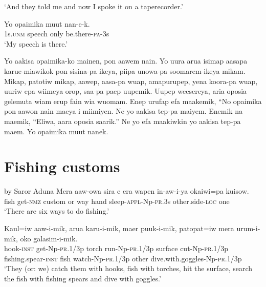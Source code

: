 \glt ‘And they told me and now I spoke it on a taperecorder.’ \\
\z


\ea
\gll  Yo  opaimika  muut  nan-e-k. \\
1s.\textsc{unm}  speech  only  be.there-\textsc{pa}-3s \\
\glt ‘My speech is there.’ \\
\z


Yo  aakisa  opaimika-ko  mainen,  pon  aawem  nain. 
Yo  uura  arua  isimap  aasapa  karue-miawikok   pon  sisina-pa  ikeya,  piipa  unowa-pa soomarem-ikeya  mikam. 
Mikap,  patotiw  mikap,  aawep,  aasa-pa  wuap,  amapurupep,  yena  koora-pa wuap,  uuriw  epa  wiimeya  orop,                     saa-pa  paep  uupemik. 
Uupep  weesereya,  aria  oposia  gelemuta  wiam  erup fain  wia  wuomam. 
Enep  urufap  efa  maakemik,  “No  opaimika     pon  aawon  nain  maeya  i  miimiyen. 
Ne  yo  aakisa  tep-pa  maiyem. 
Enemik  na  maemik,  “Eliwa,  aara  oposia  saarik.” 
Ne  yo  efa  maakiwkin  yo  aakisa  tep-pa  maem. 
Yo  opaimika  muut  nanek. 


\section{Fishing customs}\label{app:2:fishing}
by Saror Aduna
\ea
\gll  Mera  aaw-owa  sira  e  era  wapen  in-aw-i-ya        okaiwi=pa  kuisow. \\
fish  get-\textsc{nmz}  custom  or  way  hand  sleep-\textsc{appl}-Np-\textsc{pr}.3s   other.side-\textsc{loc}  one \\


\glt ‘There are six ways to do fishing.’ \\
\z


\ea
\gll  Kaul=iw  aaw-i-mik,  arua  karu-i-mik,     maer  puuk-i-mik,  patopat=iw  mera                urum-i-mik,  oko  galasim-i-mik. \\
hook-\textsc{inst}  get-Np-\textsc{pr}.1/3p  torch  run-Np-\textsc{pr}.1/3p surface  cut-Np-\textsc{pr}.1/3p  fishing.spear-\textsc{inst}  fish  watch-Np-\textsc{pr}.1/3p  other  dive.with.goggles-Np-\textsc{pr}.1/3p \\




\glt ‘They (or: we) catch them with hooks, fish with torches, hit the surface, search the fish with fishing spears and dive with goggles.’ \\
\z


